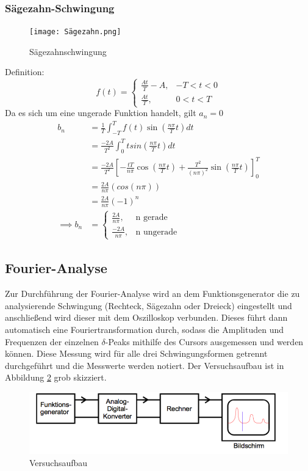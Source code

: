 \subsubsection{Sägezahn-Schwingung}
\begin{figure}[h]
  \centering
  \texttt{[image: Sägezahn.png]}
  \caption{Sägezahnschwingung \cite{Schwingungen}}
  \label{fig:säge}
\end{figure}
Definition:
\begin{equation}
  f(t)= \begin{cases}
        \frac{At}{T} - A  , & -T < t < 0 \\
        \frac{At}{T} , & 0 < t < T
      \end{cases}
\end{equation}
Da es sich um eine ungerade Funktion handelt, gilt $a_n = 0 $
\begin{align*}
  b_n &= \frac{1}{T} \int_{-T}^T f(t) \sin (\frac{n\pi}{T}t) dt \\
  &= \frac{-2A}{T^2} \int_0^T tsin( \frac{n\pi}{T}t) dt \\
  &= \frac{-2A}{T^2} [- \frac{tT}{n\pi} \cos (\frac{n\pi}{T}t)
  +\frac{T^2}{(n\pi)^2} \sin (\frac{n\pi}{T}t)]_0^T \\
  &= \frac{2A}{n\pi}(cos(n\pi)) \\
  &= \frac{2A}{n\pi}(-1)^n \\
  \implies b_n &= \begin{cases}
        \frac{2A}{n\pi}  , &\text{n gerade} \\
        \frac{-2A}{n\pi}  , &\text{n ungerade}
      \end{cases}
\end{align*}

\subsection{Fourier-Analyse}
Zur Durchführung der Fourier-Analyse wird an dem Funktionsgenerator
die zu analysierende Schwingung (Rechteck, Sägezahn
oder Dreieck) eingestellt und anschließend wird dieser
mit dem Oszilloskop verbunden. Dieses führt dann automatisch eine
Fouriertransformation durch, sodass die Amplituden und Frequenzen der einzelnen
$\delta$-Peaks mithilfe des Cursors ausgemessen und werden können. Diese Messung
wird für alle drei Schwingungsformen getrennt durchgeführt und die Messwerte
werden notiert. Der Versuchsaufbau ist in Abbildung \ref{fig:Aufbau} grob
skizziert.

\begin{figure}[h]
  \centering
  \includegraphics[width=15cm]{Aufbau.png}
  \caption{Versuchsaufbau \cite{skript}}
  \label{fig:Aufbau}
\end{figure}

